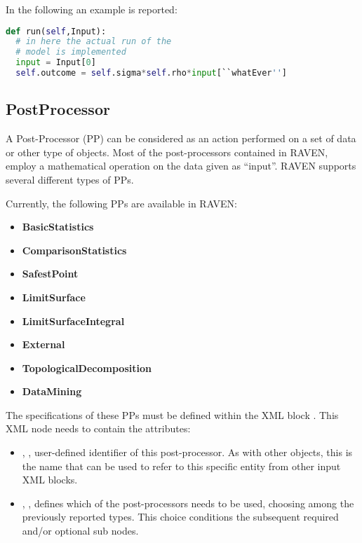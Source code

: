 In the following an example is reported:
\begin{lstlisting}[language=python]
def run(self,Input):
  # in here the actual run of the
  # model is implemented
  input = Input[0]
  self.outcome = self.sigma*self.rho*input[``whatEver'']
\end{lstlisting}

%


\subsection{PostProcessor}
\label{sec:models_postProcessor}
A Post-Processor (PP) can be considered as an action performed on a set of data
or other type of objects.
%
Most of the post-processors contained in RAVEN, employ a mathematical operation
on the data given as ``input''.
%
RAVEN supports several different types of PPs.

Currently, the following PPs are available in RAVEN:
\begin{itemize}
  \itemsep0em
  \item \textbf{BasicStatistics}
  \item \textbf{ComparisonStatistics}
  \item \textbf{SafestPoint}
  \item \textbf{LimitSurface}
  \item \textbf{LimitSurfaceIntegral}
  \item \textbf{External}
  \item \textbf{TopologicalDecomposition}
  \item \textbf{DataMining}
\end{itemize}

The specifications of these PPs must be defined within the XML block
.
%
This XML node needs to contain the attributes:
\vspace{-5mm}
\begin{itemize}
  \itemsep0em
  \item {}, , user-defined
  identifier of this post-processor.
  \nb As with other objects, this is the name that can be used to refer to this
  specific entity from other input XML blocks.
  \item {}, , defines which of
  the post-processors needs to be used, choosing among the previously reported
  types.
  This choice conditions the subsequent required and/or optional
   sub nodes.
\end{itemize}
\vspace{-5mm}

